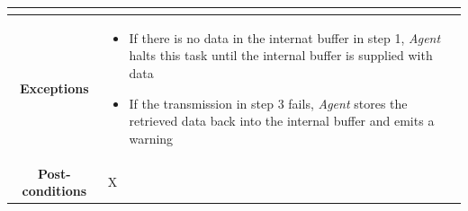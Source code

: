 \documentclass[12pt,a4paper,table]{article}
\begin{document}
\begin{longtable}{ |c|p{11.8cm}| }
{\begin{itemize}
                    \end{itemize}
                }\\ \hline
                \cellcolor[gray]{0.9} \textbf{Exceptions} & 
                    \begin{itemize}
                        \item If there is no data in the internat buffer in step 1, \textit{Agent} halts this task until the internal buffer is supplied with data
                        \item If the transmission in step 3 fails, \textit{Agent} stores the retrieved data back into the internal buffer and emits a warning
                    \end{itemize}\\ \hline
                \cellcolor[gray]{0.9} \textbf{Post-conditions} & X\\ \hline
            \end{longtable}
\end{document}
